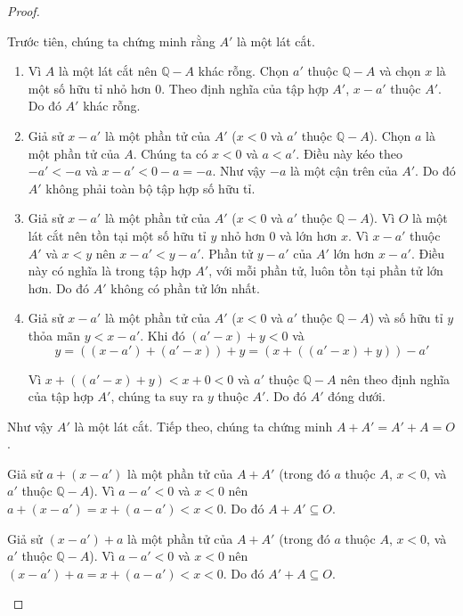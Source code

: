 \begin{proof}
\begin{enumerate}[label={(\roman*)}]
              Trước tiên, chúng ta chứng minh rằng $A'$ là một lát cắt.
              \begin{enumerate}[label={(DC\arabic*)}]
                  \item Vì $A$ là một lát cắt nên $\mathbb{Q} - A$ khác rỗng. Chọn $a'$ thuộc $\mathbb{Q} - A$ và chọn $x$ là một số hữu tỉ nhỏ hơn $0$. Theo định nghĩa của tập hợp $A'$, $x - a'$ thuộc $A'$. Do đó $A'$ khác rỗng.
                  \item Giả sử $x - a'$ là một phần tử của $A'$ ($x < 0$ và $a'$ thuộc $\mathbb{Q} - A$). Chọn $a$ là một phần tử của $A$. Chúng ta có $x < 0$ và $a < a'$. Điều này kéo theo $-a' < -a$ và $x - a' < 0 - a = -a$. Như vậy $-a$ là một cận trên của $A'$. Do đó $A'$ không phải toàn bộ tập hợp số hữu tỉ.
                  \item Giả sử $x - a'$ là một phần tử của $A'$ ($x < 0$ và $a'$ thuộc $\mathbb{Q} - A$). Vì $O$ là một lát cắt nên tồn tại một số hữu tỉ $y$ nhỏ hơn $0$ và lớn hơn $x$. Vì $x - a'$ thuộc $A'$ và $x < y$ nên $x - a' < y - a'$. Phần tử $y - a'$ của $A'$ lớn hơn $x - a'$. Điều này có nghĩa là trong tập hợp $A'$, với mỗi phần tử, luôn tồn tại phần tử lớn hơn. Do đó $A'$ không có phần tử lớn nhất.
                  \item Giả sử $x - a'$ là một phần tử của $A'$ ($x < 0$ và $a'$ thuộc $\mathbb{Q} - A$) và số hữu tỉ $y$ thỏa mãn $y < x - a'$. Khi đó $(a' - x) + y < 0$ và
                        \[
                            y = ((x - a') + (a' - x)) + y = (x + ((a' - x) + y)) - a'
                        \]

                        Vì $x + ((a' - x) + y) < x + 0 < 0$ và $a'$ thuộc $\mathbb{Q} - A$ nên theo định nghĩa của tập hợp $A'$, chúng ta suy ra $y$ thuộc $A'$. Do đó $A'$ đóng dưới.
              \end{enumerate}

              Như vậy $A'$ là một lát cắt. Tiếp theo, chúng ta chứng minh $A + A' = A' + A = O$.

              Giả sử $a + (x - a')$ là một phần tử của $A + A'$ (trong đó $a$ thuộc $A$, $x < 0$, và $a'$ thuộc $\mathbb{Q} - A$). Vì $a - a' < 0$ và $x < 0$ nên $a + (x - a') = x + (a - a') < x < 0$. Do đó $A + A' \subseteq O$.

              Giả sử $(x - a') + a$ là một phần tử của $A + A'$ (trong đó $a$ thuộc $A$, $x < 0$, và $a'$ thuộc $\mathbb{Q} - A$). Vì $a - a' < 0$ và $x < 0$ nên $(x - a') + a = x + (a - a') < x < 0$. Do đó $A' + A \subseteq O$.


\end{enumerate}
\end{proof}
